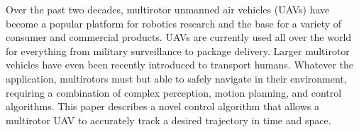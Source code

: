 
Over the past two decades, multirotor unmanned air vehicles (UAVs) have become a
popular platform for robotics research and the base for a variety of consumer and
commercial products. UAVs are currently used all over the world for everything
from military surveillance to package delivery. Larger multirotor vehicles
have even been recently introduced to transport humans. Whatever the
application, multirotors must but able to safely navigate in their environment,
requiring a combination of complex perception, motion planning, and control
algorithms. This paper describes a novel control algorithm that allows a multirotor UAV to
accurately track a desired trajectory in time and space. 
